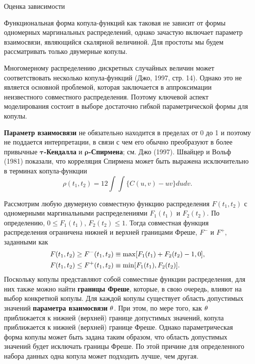         \begin{center}Оценка зависимости\end{center} %
        \noindent
Функциональная форма копула-функций как таковая не зависит от формы одномерных маргинальных распределений, однако зачастую включает параметр взаимосвязи, являющийся скалярной величиной. Для простоты мы будем рассматривать только двумерные копулы.

Многомерному распределению дискретных случайных величин может соответствовать несколько копула-функций (Джо, 1997, стр. 14). Однако это не является основной проблемой, которая заключается в аппроксимации неизвестного совместного распределения. Поэтому ключевой аспект моделирования состоит в выборе достаточно гибкой параметрической формы для копулы.

\textbf{Параметр взаимосвязи} не обязательно находится в пределах от 0 до 1 и поэтому не поддается интерпретации, в связи с чем его обычно преобразуют в более привычные \textbf{$\bm{\tau}$-Кендалла} и \textbf{$\bm{\rho}$-Спирмена}; см. Джо (1997). Швайцер и Вольф (1981) показали, что корреляция Спирмена может быть выражена исключительно в терминах копула-функции
    $$\rho(t_1,t_2) = 12 \int\int{\{C(u,v) - uv\}}dudv.$$

Рассмотрим любую двумерную совместную функцию распределения $F(t_1, t_2)$ с одномерными маргинальными распределениями $F_1(t_1)$ и $F_2(t_2)$. По определению, $0 \le F_1(t_1)$, $F_2(t_2) \le 1$. Тогда совместная функция распределения ограничена нижней и верхней границами Фреше, $F^-$ и $F^+$, заданными как
    \begin{align}
    F(t_1,t_2) \ge F^{-}(t_1,t_2) &\equiv \max[F_1(t_1) + F_2(t_2) - 1, 0], \notag \\
    F(t_1,t_2) \le F^{+}(t_1,t_2) &\equiv \min[F_1(t_1), F_2(t_2)]. \notag
    \end{align}
Поскольку копулы представляют собой совместные функции распределения, для них также можно найти \textbf{границы Фреше}, которые, в свою очередь, влияют на выбор конкретной копулы. Для каждой копулы существует область допустимых значений \textbf{параметра взаимосвязи} $\theta$. При этом, по мере того, как $\theta$ приближается к нижней (верхней) границе допустимых значений, копула приближается к нижней (верхней) границе Фреше. Однако параметрическая форма копулы может быть задана таким образом, что область допустимых значений будет исключать границы Фреше. По этой причине для определенного набора данных одна копула может подходить лучше, чем другая.




